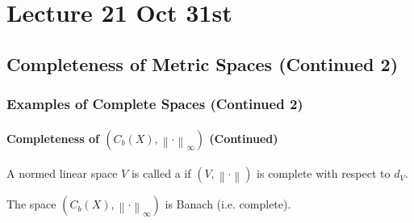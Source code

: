 \documentclass[notoc,notitlepage]{tufte-book}
\newcommand{\norm}[1]{\left\| #1 \right\|}
\begin{document}



\chapter{Lecture 21 Oct 31st}%
\label{chp:lecture_21_oct_31st}

\section{Completeness of Metric Spaces (Continued 2)}%
\label{sec:completeness_of_metric_spaces_continued_2}

\subsection{Examples of Complete Spaces (Continued 2)}%
\label{sub:examples_of_complete_spaces_continued_2}

\subsubsection{Completeness of $(C_b(X), \norm\cdot_\infty)$ (Continued)}%
\label{ssub:completeness_of_c_b_x_norm_cdot_infty_continued}

\begin{note}
  A normed linear space $V$ is called a   if $(V, \norm\cdot)$ is complete with respect to $d_V$.
\end{note}

\begin{thm}\label{thm:completeness_for_c_b_x_}
  The space $(C_b(X), \norm\cdot_\infty)$ is Banach (i.e. complete).
\end{thm}
\end{document}
